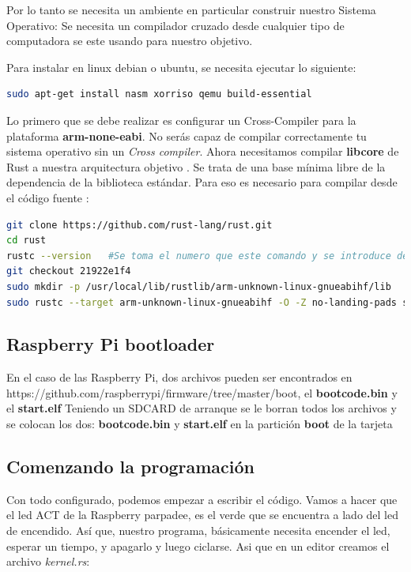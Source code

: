 \documentclass[12pt, twoside]{report}
\begin{document}
Por lo tanto se necesita un ambiente en particular construir nuestro Sistema Operativo: Se necesita un compilador cruzado desde cualquier tipo de computadora se este usando para nuestro objetivo.

Para instalar en linux debian o ubuntu, se necesita ejecutar lo siguiente:

\begin{lstlisting}[language=bash]
sudo apt-get install nasm xorriso qemu build-essential
\end{lstlisting}

Lo primero que se debe realizar es configurar un Cross-Compiler para la plataforma \textbf{arm-none-eabi}. No serás capaz de compilar correctamente tu sistema operativo sin un \textit{Cross compiler}. Ahora necesitamos compilar \textbf{libcore} de Rust a nuestra arquitectura objetivo . Se trata de una base mínima libre de la dependencia de la biblioteca estándar. Para eso es necesario para compilar desde el código fuente :

\begin{lstlisting}[language=bash]
git clone https://github.com/rust-lang/rust.git
cd rust
rustc --version   #Se toma el numero que este comando y se introduce despues del comando checkout de la linea siguiente
git checkout 21922e1f4
sudo mkdir -p /usr/local/lib/rustlib/arm-unknown-linux-gnueabihf/lib 
sudo rustc --target arm-unknown-linux-gnueabihf -O -Z no-landing-pads src/libcore/lib.rs --out-dir /usr/local/lib/rustlib/arm-unknown-linux-gnueabihf/lib
\end{lstlisting}

\subsection{Raspberry Pi bootloader}

En el caso de las Raspberry Pi, dos archivos pueden ser encontrados en https://github.com/raspberrypi/firmware/tree/master/boot, el \textbf{bootcode.bin} y el \textbf{start.elf}
Teniendo un SDCARD de arranque se le borran todos los archivos y se colocan los dos:  \textbf{bootcode.bin} y \textbf{start.elf} en la partición \textbf{boot} de la tarjeta

\subsection{Comenzando la programación}

Con todo configurado, podemos empezar a escribir el código. Vamos a hacer que el led ACT de la Raspberry parpadee, es el verde que se encuentra a lado del led de encendido. Así que, nuestro programa, básicamente necesita encender el led, esperar un tiempo, y apagarlo y luego ciclarse. Asi que en un editor creamos el archivo \emph{kernel.rs}:
\end{document}
